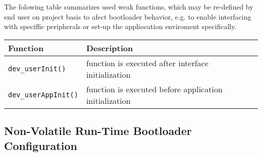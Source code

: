    The folowing table summarizes used weak functions, which may be re-defined by end user on project basis to afect bootloader behavior, e.g. to enable interfacing with speciffic peripherals or set-up the appliocation enviroment specifically.
   
   \begin{table*}[!ht]
    \hspace*{-4cm}
    \begin{tabular}{| p{5.5cm} | p{7.5cm} |}
        \hline
        \rowcolor{SeaGreen3!30!} {\bf Function} & {\bf Description} \\
        \hline
        \hline
        \texttt{dev\_userInit()} & function is executed after interface initialization\\
        \hline
        \texttt{dev\_userAppInit()} & function is executed before application initialization\\
        \hline
    \end{tabular}
    \label{tab:cmdset}
   \end{table*}
   

\clearpage
\subsection{Non-Volatile Run-Time Bootloader Configuration} \label{sec:cfg:runtime}

